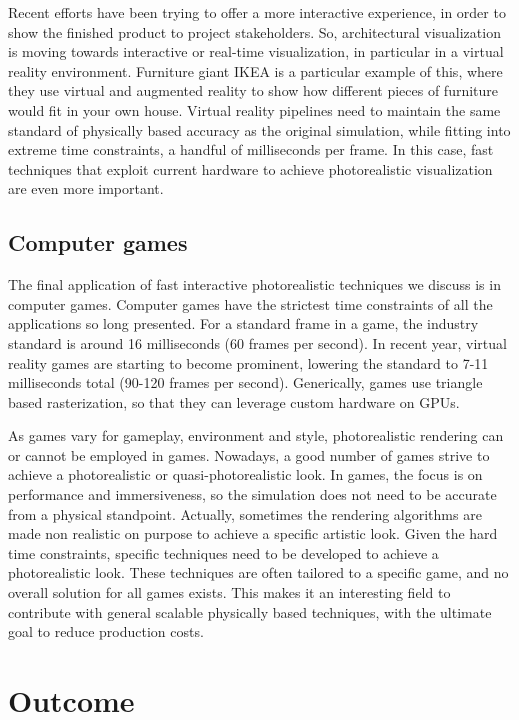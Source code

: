 Recent efforts have been trying to offer a more interactive experience, in order to show the finished product to project stakeholders. So, architectural visualization is moving towards interactive or real-time visualization, in particular in a virtual reality environment. Furniture giant IKEA is a particular example of this, where they use virtual and augmented reality to show how different pieces of furniture would fit in your own house. Virtual reality pipelines need to maintain the same standard of physically based accuracy as the original simulation, while fitting into extreme time constraints, a handful of milliseconds per frame. In this case, fast techniques that exploit current hardware to achieve photorealistic visualization are even more important.


\subsection{Computer games}

The final application of fast interactive photorealistic techniques we discuss is in computer games. Computer games have the strictest time constraints of all the applications so long presented. For a standard frame in a game, the industry standard is around 16 milliseconds (60 frames per second). In recent year, virtual reality games are starting to become prominent, lowering the standard to 7-11 milliseconds total (90-120 frames per second). Generically, games use triangle based rasterization, so that they can leverage custom hardware on GPUs. 

As games vary for gameplay, environment and style, photorealistic rendering can or cannot be employed in games. Nowadays, a good number of games strive to achieve a photorealistic or quasi-photorealistic look. In games, the focus is on performance and immersiveness, so the simulation does not need to be accurate from a physical standpoint. Actually, sometimes the rendering algorithms are made non realistic on purpose to achieve a specific artistic look. Given the hard time constraints, specific techniques need to be developed to achieve a photorealistic look. These techniques are often tailored to a specific game, and no overall solution for all games exists. This makes it an interesting field to contribute with general scalable physically based techniques, with the ultimate goal to reduce production costs.

\section{Outcome}

